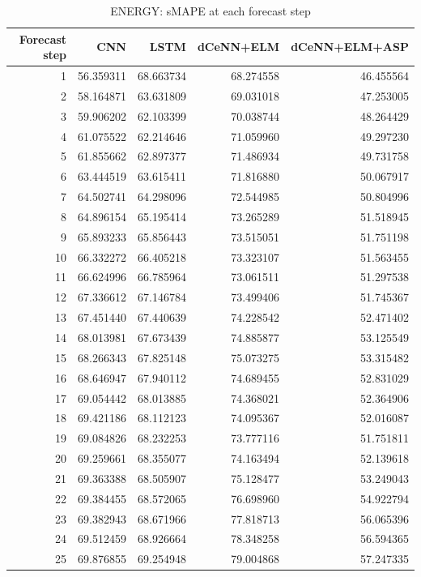 \begin{table}
\caption{ENERGY: sMAPE at each forecast step}
\begin{tabular}{rrrrr}
\toprule
Forecast step & CNN & LSTM & dCeNN+ELM & dCeNN+ELM+ASP \\
\midrule
1 & 56.359311 & 68.663734 & 68.274558 & 46.455564 \\
2 & 58.164871 & 63.631809 & 69.031018 & 47.253005 \\
3 & 59.906202 & 62.103399 & 70.038744 & 48.264429 \\
4 & 61.075522 & 62.214646 & 71.059960 & 49.297230 \\
5 & 61.855662 & 62.897377 & 71.486934 & 49.731758 \\
6 & 63.444519 & 63.615411 & 71.816880 & 50.067917 \\
7 & 64.502741 & 64.298096 & 72.544985 & 50.804996 \\
8 & 64.896154 & 65.195414 & 73.265289 & 51.518945 \\
9 & 65.893233 & 65.856443 & 73.515051 & 51.751198 \\
10 & 66.332272 & 66.405218 & 73.323107 & 51.563455 \\
11 & 66.624996 & 66.785964 & 73.061511 & 51.297538 \\
12 & 67.336612 & 67.146784 & 73.499406 & 51.745367 \\
13 & 67.451440 & 67.440639 & 74.228542 & 52.471402 \\
14 & 68.013981 & 67.673439 & 74.885877 & 53.125549 \\
15 & 68.266343 & 67.825148 & 75.073275 & 53.315482 \\
16 & 68.646947 & 67.940112 & 74.689455 & 52.831029 \\
17 & 69.054442 & 68.013885 & 74.368021 & 52.364906 \\
18 & 69.421186 & 68.112123 & 74.095367 & 52.016087 \\
19 & 69.084826 & 68.232253 & 73.777116 & 51.751811 \\
20 & 69.259661 & 68.355077 & 74.163494 & 52.139618 \\
21 & 69.363388 & 68.505907 & 75.128477 & 53.249043 \\
22 & 69.384455 & 68.572065 & 76.698960 & 54.922794 \\
23 & 69.382943 & 68.671966 & 77.818713 & 56.065396 \\
24 & 69.512459 & 68.926664 & 78.348258 & 56.594365 \\
25 & 69.876855 & 69.254948 & 79.004868 & 57.247335 \\

\end{tabular}
\end{table}

